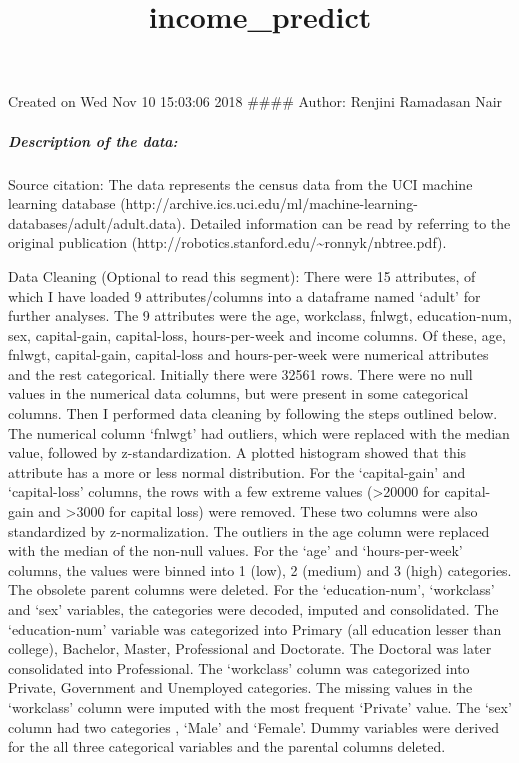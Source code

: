 \documentclass[11pt]{article}
\title{income\_predict}
\begin{document}
    
    
    \maketitle
    
    

    
    Created on Wed Nov 10 15:03:06 2018 \#\#\#\# Author: Renjini Ramadasan
Nair

    \hypertarget{description-of-the-data}{%
\subparagraph{Description of the data:}\label{description-of-the-data}}

Source citation: The data represents the census data from the UCI
machine learning database
(http://archive.ics.uci.edu/ml/machine-learning-databases/adult/adult.data).
Detailed information can be read by referring to the original
publication
(http://robotics.stanford.edu/\textasciitilde{}ronnyk/nbtree.pdf).

Data Cleaning (Optional to read this segment): There were 15 attributes,
of which I have loaded 9 attributes/columns into a dataframe named
`adult' for further analyses. The 9 attributes were the age, workclass,
fnlwgt, education-num, sex, capital-gain, capital-loss, hours-per-week
and income columns. Of these, age, fnlwgt, capital-gain, capital-loss
and hours-per-week were numerical attributes and the rest categorical.
Initially there were 32561 rows. There were no null values in the
numerical data columns, but were present in some categorical columns.
Then I performed data cleaning by following the steps outlined below.
The numerical column `fnlwgt' had outliers, which were replaced with the
median value, followed by z-standardization. A plotted histogram showed
that this attribute has a more or less normal distribution. For the
`capital-gain' and `capital-loss' columns, the rows with a few extreme
values (\textgreater{}20000 for capital-gain and \textgreater{}3000 for
capital loss) were removed. These two columns were also standardized by
z-normalization. The outliers in the age column were replaced with the
median of the non-null values. For the `age' and `hours-per-week'
columns, the values were binned into 1 (low), 2 (medium) and 3 (high)
categories. The obsolete parent columns were deleted. For the
`education-num', `workclass' and `sex' variables, the categories were
decoded, imputed and consolidated. The `education-num' variable was
categorized into Primary (all education lesser than college), Bachelor,
Master, Professional and Doctorate. The Doctoral was later consolidated
into Professional. The `workclass' column was categorized into Private,
Government and Unemployed categories. The missing values in the
`workclass' column were imputed with the most frequent `Private' value.
The `sex' column had two categories , `Male' and `Female'. Dummy
variables were derived for the all three categorical variables and the
parental columns deleted.
\end{document}
